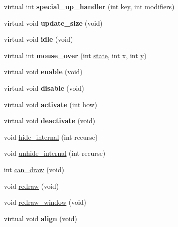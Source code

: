 \begin{DoxyCompactItemize}
\item 
\hypertarget{class_g_l_u_i___control_a85c0f6d3699768218a62d67bf6efa702}{virtual int {\bfseries special\+\_\+up\+\_\+handler} (int key, int modifiers)}\label{class_g_l_u_i___control_a85c0f6d3699768218a62d67bf6efa702}

\item 
\hypertarget{class_g_l_u_i___control_a4bfe55acbbf735a7d2ff07d687a481e2}{virtual void {\bfseries update\+\_\+size} (void)}\label{class_g_l_u_i___control_a4bfe55acbbf735a7d2ff07d687a481e2}

\item 
\hypertarget{class_g_l_u_i___control_a4eb47a3c2c20c0c24dca192a2eb96c8d}{virtual void {\bfseries idle} (void)}\label{class_g_l_u_i___control_a4eb47a3c2c20c0c24dca192a2eb96c8d}

\item 
\hypertarget{class_g_l_u_i___control_ac16c3ff7bef1a64abd36a00aa3d935d8}{virtual int {\bfseries mouse\+\_\+over} (int \hyperlink{structstate}{state}, int x, int \hyperlink{_ice_utils_8h_aa7ffaed69623192258fb8679569ff9ba}{y})}\label{class_g_l_u_i___control_ac16c3ff7bef1a64abd36a00aa3d935d8}

\item 
\hypertarget{class_g_l_u_i___control_a574856beba946e72e0aea31ace96d94a}{virtual void {\bfseries enable} (void)}\label{class_g_l_u_i___control_a574856beba946e72e0aea31ace96d94a}

\item 
\hypertarget{class_g_l_u_i___control_aa0f11adca623c75aae9690052047e06d}{virtual void {\bfseries disable} (void)}\label{class_g_l_u_i___control_aa0f11adca623c75aae9690052047e06d}

\item 
\hypertarget{class_g_l_u_i___control_af686704718daf4761d17e4da83c03aad}{virtual void {\bfseries activate} (int how)}\label{class_g_l_u_i___control_af686704718daf4761d17e4da83c03aad}

\item 
\hypertarget{class_g_l_u_i___control_a9d18764a6cfe25c220c845eff480d4fe}{virtual void {\bfseries deactivate} (void)}\label{class_g_l_u_i___control_a9d18764a6cfe25c220c845eff480d4fe}

\item 
void \hyperlink{class_g_l_u_i___control_ae88270c442111baddf290f4a153caed1}{hide\+\_\+internal} (int recurse)
\item 
void \hyperlink{class_g_l_u_i___control_a73192b0fdcaa75eb04d43fa70abe246f}{unhide\+\_\+internal} (int recurse)
\item 
int \hyperlink{class_g_l_u_i___control_add5d7aa8efcd213181cf84975661e168}{can\+\_\+draw} (void)
\item 
void \hyperlink{class_g_l_u_i___control_a7777125cd866884377899df625bad6cd}{redraw} (void)
\item 
void \hyperlink{class_g_l_u_i___control_aecb4bacd8f4ff12de6ffcecc166d3adc}{redraw\+\_\+window} (void)
\item 
\hypertarget{class_g_l_u_i___control_a54f010ee55d9623325126868677e9e3b}{virtual void {\bfseries align} (void)}\label{class_g_l_u_i___control_a54f010ee55d9623325126868677e9e3b}


\end{DoxyCompactItemize}
